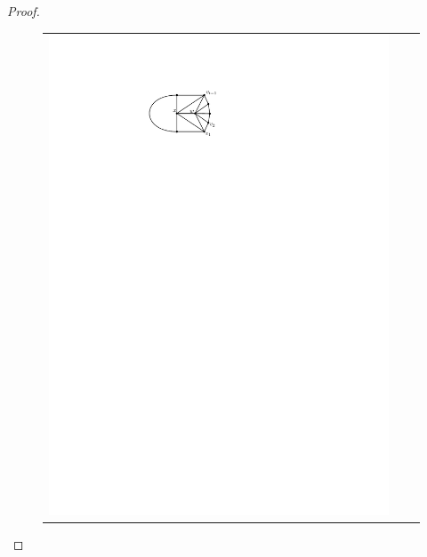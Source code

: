 \documentclass[12pt]{article}
\theoremstyle{definition}
\begin{document}
\begin{proof}
  \begin{figure}[htbp]
    \centering
    \begin{tabular}{ccc}
      \includegraphics[page=1]{figs/killing_a_leaf} &

\end{tabular}
\end{figure}
\end{proof}
\end{document}
